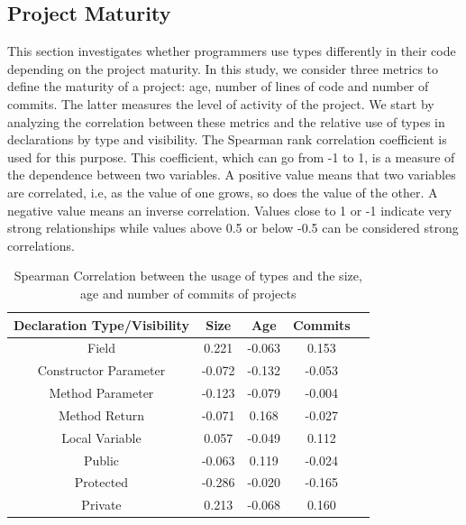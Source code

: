 \documentclass[preprint]{sigplanconf}
\begin{document}


\subsection{Project Maturity\label{sec:results-maturity}}
This section investigates whether programmers use types differently in their code depending on the project maturity.
In this study, we consider three metrics to define the maturity of a project: age, number of lines of code and number of commits.
The latter measures the level of activity of the project.
We start by analyzing the correlation between these metrics and the relative use of types in declarations by type and visibility.
The Spearman rank correlation coefficient is used for this purpose.
This coefficient, which can go from -1 to 1, is a measure of the dependence between two variables.
A positive value means that two variables are correlated, i.e, as the value of one grows, so does the value of the other.
A negative value means an inverse correlation.
Values close to 1 or -1 indicate very strong relationships while values above 0.5 or below -0.5 can be considered strong correlations.

\begin{table}[h!]
\centering{}%
\begin{tabular}{|c|c|c|c|c|}
\hline 
Declaration Type/Visibility	& Size		& Age	&	Commits\\
\hline 
\hline 
Field						&  0.221	& -0.063	&  0.153	\\ \hline
Constructor Parameter		& -0.072	& -0.132	& -0.053	\\ \hline
Method Parameter			& -0.123	& -0.079	& -0.004	\\ \hline
Method Return				& -0.071	&  0.168	& -0.027	\\ \hline
Local Variable		 		&  0.057	& -0.049	&  0.112	\\ 
\hline 			 
\hline 		 
Public						& -0.063	&   0.119	& -0.024	\\ \hline
Protected					& -0.286	&  -0.020	& -0.165	\\ \hline
Private				 		&  0.213	&  -0.068	&  0.160	\\ \hline
\end{tabular}
\caption{Spearman Correlation between the usage of types and the size, age and number of commits of projects}
\label{tab:all_correlation_maturity}
\end{table}	
\end{document}
